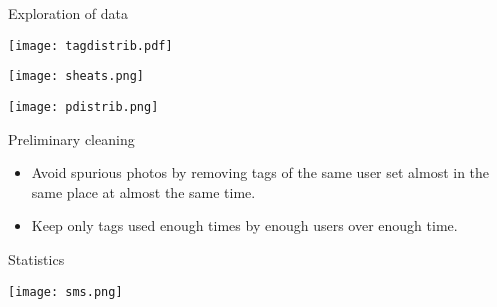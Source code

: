 \begin{frame}{Exploration of data}

\begin{center}
\texttt{[image: tagdistrib.pdf]}
\end{center}

\end{frame}

\begin{frame}

\begin{center}
\texttt{[image: sheats.png]}
\end{center}

\end{frame}

\begin{frame}

\begin{center}
\texttt{[image: pdistrib.png]}
\end{center}

\end{frame}

\begin{frame}{Preliminary cleaning}

\begin{itemize}
\item
  Avoid spurious photos by removing tags of the same user set almost in
  the same place at almost the same time.
\item
  Keep only tags used enough times by enough users over enough time.
\end{itemize}

\end{frame}

\begin{frame}{Statistics}

\begin{center} \texttt{[image: sms.png]} \end{center}

\end{frame}

